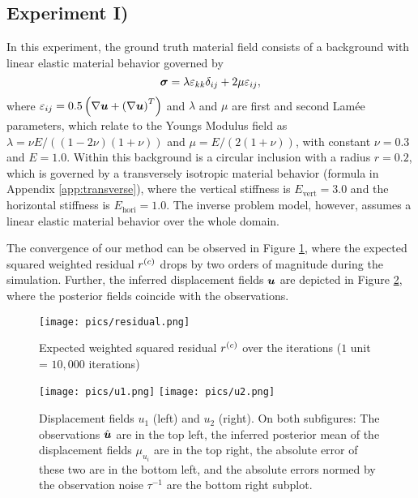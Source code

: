 \subsection{Experiment I)}
In this experiment, the ground truth material field consists of a background with linear elastic material behavior governed by
\begin{equation}
    \boldsymbol{\sigma} = \lambda \varepsilon_{kk} \delta_{ij} + 2 \mu \varepsilon_{ij},
\end{equation}
where $\varepsilon_{ij} = 0.5 \left( \nabla \boldsymbol{u} + \left( \nabla \boldsymbol{u} \right)^T \right)$ and $\lambda$ and $\mu$ are first and second Lamée parameters, which relate to the Youngs Modulus field as $\lambda = \nu E / \left( \left( 1-2\nu \right) \left(1+\nu \right) \right)$ and $\mu = E / \left(2 \left(1+\nu \right) \right)$, with constant $\nu = 0.3$ and $E=1.0$. Within this background is a circular inclusion with a radius $r=0.2$, which is governed by a transversely isotropic material behavior (formula in Appendix \ref{app:transverse}), where the vertical stiffness is $E_\mathrm{vert} = 3.0$ and the horizontal stiffness is $E_\mathrm{hori} = 1.0$. The inverse problem model, however, assumes a linear elastic material behavior over the whole domain.

The convergence of our method can be observed in Figure \ref{fig:r}, where the expected squared weighted residual $r^{(c)}$ drops by two orders of magnitude during the simulation. Further, the inferred displacement fields $\boldsymbol{u}$ are depicted in Figure \ref{fig:u}, where the posterior fields coincide with the observations. 
\begin{figure}
    \centering
    \texttt{[image: pics/residual.png]}
    \caption{Expected weighted squared residual $r^{(c)}$ over the iterations ($1$ unit = $10,000$ iterations)}
    \label{fig:r}
\end{figure}

\begin{figure}
    \centering
    \texttt{[image: pics/u1.png]}
    \hfill
    \texttt{[image: pics/u2.png]}
    \caption{Displacement fields $u_1$ (left) and $u_2$ (right). On both subfigures: The observations $\hat{\boldsymbol{u}}$ are in the top left, the inferred posterior mean of the displacement fields  $\mu_{u_i}$ are in the top right, the absolute error of these two are in the bottom left, and the absolute errors normed by the observation noise $\tau^{-1}$ are the bottom right subplot.}
    \label{fig:u}
\end{figure}

